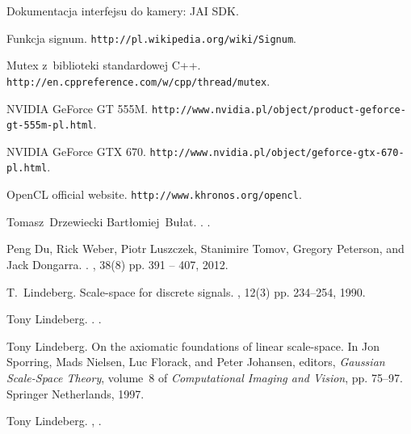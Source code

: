 \documentclass[pdflatex,11pt]{aghdpl}
\author{Tomasz Drzewiecki}
\date{2013}
\begin{document}
\titlepages

\tableofcontents
\clearpage










%
%
%
%


%

\begin{thebibliography}{10}

{Dokumentacja interfejsu do kamery: JAI SDK}.

Funkcja signum.
\newblock \texttt{http://pl.wikipedia.org/wiki/Signum}.

{Mutex z~biblioteki standardowej C++}.
\newblock \texttt{http://en.cppreference.com/w/cpp/thread/mutex}.

{NVIDIA GeForce GT 555M}.
\newblock \texttt{http://www.nvidia.pl/object/product-geforce-gt-555m-pl.html}.

{NVIDIA GeForce GTX 670}.
\newblock \texttt{http://www.nvidia.pl/object/geforce-gtx-670-pl.html}.

{OpenCL official website}.
\newblock \texttt{http://www.khronos.org/opencl}.

Tomasz~Drzewiecki Bartłomiej~Bułat.
.
.

Peng Du, Rick Weber, Piotr Luszczek, Stanimire Tomov, Gregory Peterson, and
  Jack Dongarra.
.
, 38(8) pp. 391 -- 407, 2012.

T.~Lindeberg.
\newblock Scale-space for discrete signals.
, 12(3) pp. 234--254, 1990.

Tony Lindeberg.
.
.

Tony Lindeberg.
\newblock On the axiomatic foundations of linear scale-space.
\newblock In Jon Sporring, Mads Nielsen, Luc Florack, and Peter Johansen,
  editors, {\em Gaussian Scale-Space Theory}, volume~8 of {\em Computational
  Imaging and Vision}, pp. 75--97. Springer Netherlands, 1997.

Tony Lindeberg.
,
.

\end{thebibliography}

%

\appendix




\end{document}
